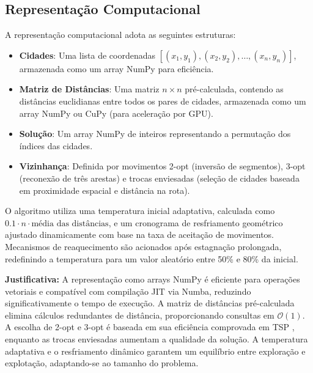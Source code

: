 \documentclass[12pt]{article}
\begin{document}
\subsection{Representação Computacional}
A representação computacional adota as seguintes estruturas:
\begin{itemize}
    \item \textbf{Cidades}: Uma lista de coordenadas \([(x_1, y_1), (x_2, y_2), \ldots, (x_n, y_n)]\), armazenada como um array NumPy para eficiência.
    \item \textbf{Matriz de Distâncias}: Uma matriz \(n \times n\) pré-calculada, contendo as distâncias euclidianas entre todos os pares de cidades, armazenada como um array NumPy ou CuPy (para aceleração por GPU).
    \item \textbf{Solução}: Um array NumPy de inteiros representando a permutação dos índices das cidades.
    \item \textbf{Vizinhança}: Definida por movimentos 2-opt (inversão de segmentos), 3-opt (reconexão de três arestas) e trocas enviesadas (seleção de cidades baseada em proximidade espacial e distância na rota).
\end{itemize}

O algoritmo utiliza uma temperatura inicial adaptativa, calculada como $0.1 \cdot n \cdot \text{média das distâncias}$, e um cronograma de resfriamento geométrico ajustado dinamicamente com base na taxa de aceitação de movimentos. Mecanismos de reaquecimento são acionados após estagnação prolongada, redefinindo a temperatura para um valor aleatório entre 50\% e 80\% da inicial.

\textbf{Justificativa:} A representação como arrays NumPy é eficiente para operações vetoriais e compatível com compilação JIT via Numba, reduzindo significativamente o tempo de execução. A matriz de distâncias pré-calculada elimina cálculos redundantes de distância, proporcionando consultas em $\mathcal{O}\left(1\right)$. A escolha de 2-opt e 3-opt é baseada em sua eficiência comprovada em TSP \cite{lin1973effective}, enquanto as trocas enviesadas aumentam a qualidade da solução. A temperatura adaptativa e o resfriamento dinâmico garantem um equilíbrio entre exploração e explotação, adaptando-se ao tamanho do problema.
\end{document}
